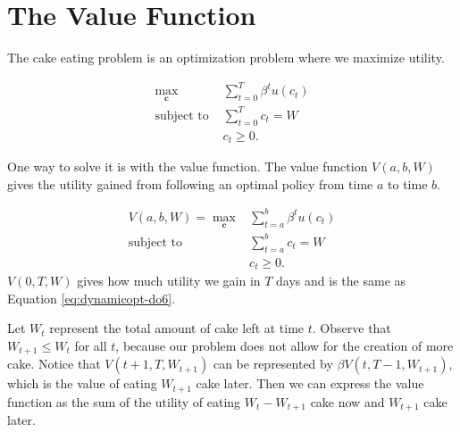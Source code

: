 %
%



\section*{The Value Function}

The cake eating problem is an optimization problem where we maximize utility.

\begin{align}\label{eq:dynamicopt-do6}
\max_{\mathbf{c}}  &\sum_{t=0}^T \beta^t u(c_t) \\
\mbox{subject to } &\sum_{t=0}^T c_t = W \nonumber\\
&c_t \geq 0.\nonumber
\end{align}

One way to solve it is with the value function.
The value function $V(a,b,W)$ gives the utility gained from following an optimal policy from time $a$ to time $b$.

\begin{align*}
V(a,b,W) = \max_{\mathbf{c}} & \sum_{t=a}^b \beta^tu(c_t) \\
\mbox{subject to } & \sum_{t=a}^b c_t = W \\
& c_t \geq 0.
\end{align*}
$V(0,T,W)$ gives how much utility we gain in $T$ days and is the same as Equation \ref{eq:dynamicopt-do6}.

Let $W_t$ represent the total amount of cake left at time $t$.
Observe that $W_{t+1} \leq W_t$ for all $t$, because our problem does not allow for the creation of more cake.
Notice that $V(t+1, T, W_{t+1})$ can be represented by $\beta V(t, T-1, W_{t+1})$, which is the value of eating $W_{t+1}$ cake later.
Then we can express the value function as the sum of the utility of eating $W_t-W_{t+1}$ cake now and $W_{t+1}$ cake later.

